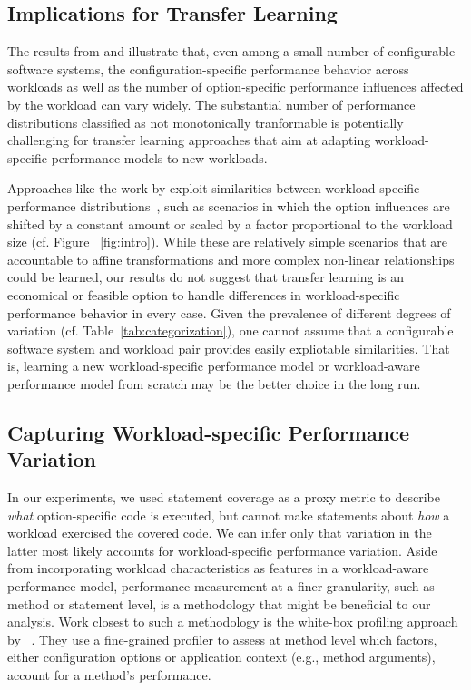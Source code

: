 {\subsection{Implications for Transfer Learning}
The results from  and  illustrate that, even among a small number of configurable software systems, the configuration-specific performance behavior across workloads as well as the number of option-specific performance influences affected by the workload can vary widely. The substantial number of performance distributions classified as not monotonically tranformable is potentially challenging for transfer learning approaches that aim at adapting workload-specific performance models to new workloads. 

Approaches like the work by \citeauthor{jamshidi_learning_2018} exploit similarities between workload-specific performance distributions~\cite{jamshidi_learning_2018}, such as scenarios in which the option influences are shifted by a constant amount or scaled by a factor proportional to the workload size (cf. Figure ~\ref{fig:intro}). While these are relatively simple scenarios that are accountable to affine transformations and more complex non-linear relationships could be learned, our results do not suggest that transfer learning is an economical or feasible option to handle differences in workload-specific performance behavior in
every case. Given the prevalence of different degrees of variation (cf. Table~\ref{tab:categorization}), one cannot assume that a configurable software system
and workload pair provides easily expliotable similarities. That is, learning a new workload-specific performance model or workload-aware performance model from scratch may be the better choice in the long run.

\subsection{Capturing Workload-specific Performance Variation}
In our experiments, we used statement coverage as a proxy metric to describe \emph{what} option-specific code is executed, but cannot make statements about \emph{how} a workload exercised the covered code. We can infer only that variation in the latter most likely accounts for workload-specific performance variation. Aside from incorporating workload characteristics as features in a workload-aware performance model, performance measurement at a finer granularity, such as method or statement level, is a methodology that might be beneficial to our analysis. Work closest to such a methodology is the white-box profiling approach by \citeauthor{weber_white_2021}~\cite{weber_white_2021}. They use a fine-grained profiler to assess at method level which factors, either configuration options or application context (e.g., method arguments), account for a method's performance. 

}
